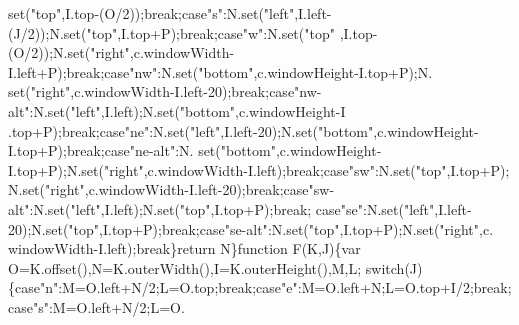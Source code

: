 \begin{DoxyCode}
{      set(\textcolor{stringliteral}{"top"},I.top-(O/2));\textcolor{keywordflow}{break};\textcolor{keywordflow}{case}\textcolor{stringliteral}{"s"}:N.set(\textcolor{stringliteral}{"left"},I.left-(J/2));N.set(\textcolor{stringliteral}{"top"},I.top+P);\textcolor{keywordflow}{break};\textcolor{keywordflow}{case}\textcolor{stringliteral}{"w"}:N.set(\textcolor{stringliteral}{"top"}
      ,I.top-(O/2));N.set(\textcolor{stringliteral}{"right"},c.windowWidth-I.left+P);\textcolor{keywordflow}{break};\textcolor{keywordflow}{case}\textcolor{stringliteral}{"nw"}:N.set(\textcolor{stringliteral}{"bottom"},c.windowHeight-I.top+P);N.
      set(\textcolor{stringliteral}{"right"},c.windowWidth-I.left-20);\textcolor{keywordflow}{break};\textcolor{keywordflow}{case}\textcolor{stringliteral}{"nw-alt"}:N.set(\textcolor{stringliteral}{"left"},I.left);N.set(\textcolor{stringliteral}{"bottom"},c.windowHeight-I
      .top+P);\textcolor{keywordflow}{break};\textcolor{keywordflow}{case}\textcolor{stringliteral}{"ne"}:N.set(\textcolor{stringliteral}{"left"},I.left-20);N.set(\textcolor{stringliteral}{"bottom"},c.windowHeight-I.top+P);\textcolor{keywordflow}{break};\textcolor{keywordflow}{case}\textcolor{stringliteral}{"ne-alt"}:N.
      set(\textcolor{stringliteral}{"bottom"},c.windowHeight-I.top+P);N.set(\textcolor{stringliteral}{"right"},c.windowWidth-I.left);\textcolor{keywordflow}{break};\textcolor{keywordflow}{case}\textcolor{stringliteral}{"sw"}:N.set(\textcolor{stringliteral}{"top"},I.top+P);
      N.set(\textcolor{stringliteral}{"right"},c.windowWidth-I.left-20);\textcolor{keywordflow}{break};\textcolor{keywordflow}{case}\textcolor{stringliteral}{"sw-alt"}:N.set(\textcolor{stringliteral}{"left"},I.left);N.set(\textcolor{stringliteral}{"top"},I.top+P);\textcolor{keywordflow}{break};\textcolor{keywordflow}{
      case}\textcolor{stringliteral}{"se"}:N.set(\textcolor{stringliteral}{"left"},I.left-20);N.set(\textcolor{stringliteral}{"top"},I.top+P);\textcolor{keywordflow}{break};\textcolor{keywordflow}{case}\textcolor{stringliteral}{"se-alt"}:N.set(\textcolor{stringliteral}{"top"},I.top+P);N.set(\textcolor{stringliteral}{"right"},c.
      windowWidth-I.left);\textcolor{keywordflow}{break}\}\textcolor{keywordflow}{return} N\}\textcolor{keyword}{function} F(K,J)\{var O=K.offset(),N=K.outerWidth(),I=K.outerHeight(),M,L;\textcolor{keywordflow}{
      switch}(J)\{\textcolor{keywordflow}{case}\textcolor{stringliteral}{"n"}:M=O.left+N/2;L=O.top;\textcolor{keywordflow}{break};\textcolor{keywordflow}{case}\textcolor{stringliteral}{"e"}:M=O.left+N;L=O.top+I/2;\textcolor{keywordflow}{break};\textcolor{keywordflow}{case}\textcolor{stringliteral}{"s"}:M=O.left+N/2;L=O.
}
\end{DoxyCode}
